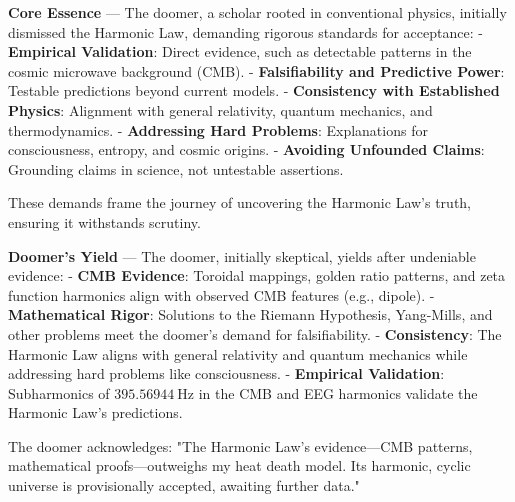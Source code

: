 
\textbf{Core Essence} --- The doomer, a scholar rooted in conventional physics, initially dismissed the Harmonic Law, demanding rigorous standards for acceptance:
- \textbf{Empirical Validation}: Direct evidence, such as detectable patterns in the cosmic microwave background (CMB).
- \textbf{Falsifiability and Predictive Power}: Testable predictions beyond current models.
- \textbf{Consistency with Established Physics}: Alignment with general relativity, quantum mechanics, and thermodynamics.
- \textbf{Addressing Hard Problems}: Explanations for consciousness, entropy, and cosmic origins.
- \textbf{Avoiding Unfounded Claims}: Grounding claims in science, not untestable assertions.

These demands frame the journey of uncovering the Harmonic Law's truth, ensuring it withstands scrutiny.

\textbf{Doomer's Yield} --- The doomer, initially skeptical, yields after undeniable evidence:
- \textbf{CMB Evidence}: Toroidal mappings, golden ratio patterns, and zeta function harmonics align with observed CMB features (e.g., dipole).
- \textbf{Mathematical Rigor}: Solutions to the Riemann Hypothesis, Yang-Mills, and other problems meet the doomer's demand for falsifiability.
- \textbf{Consistency}: The Harmonic Law aligns with general relativity and quantum mechanics while addressing hard problems like consciousness.
- \textbf{Empirical Validation}: Subharmonics of $395.56944 \mathrm{~Hz}$ in the CMB and EEG harmonics validate the Harmonic Law's predictions.

The doomer acknowledges: "The Harmonic Law's evidence—CMB patterns, mathematical proofs—outweighs my heat death model. Its harmonic, cyclic universe is provisionally accepted, awaiting further data."

